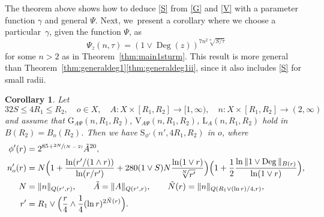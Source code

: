 \documentclass[10pt]{amsart}
\newcommand{\spfrac}[2]{\sfrac{#1}{(#2)}}
\newcommand{\rG}{\mathrm{G}}
\newcommand{\rS}{\mathrm{S}}
\newcommand{\rV}{\mathrm{V}}
\newcommand{\rL}{\mathrm{L}}
\theoremstyle{plain}
\newtheorem{corollary}[theorem]{Corollary}
\theoremstyle{definition}
\DeclareMathOperator{\Deg}{Deg}
\begin{document}
The theorem above shows how to deduce \eqref{S} from \eqref{G} and \eqref{V} with a parameter function $\gamma$ and general $\Psi$. Next, we~present a corollary where we choose a particular~$\gamma$, given the function $\Psi$, as
\[
\Psi_z(n,\tau)=\left(1\vee \Deg(z)
\right)^{7n^2\sqrt[n]{S/\tau}}
\]
for some $n>2$ as in Theorem~\ref{thm:main1sturm}. This result is more general than Theorem~\ref{thm:generaldeg1}\eqref{thm:generaldeg1ii}, since it also includes \eqref{S} for small radii.
\begin{corollary}\label{cor:sobolevall}
Let
\[
32S\leq {4} R_1\leq R_2,\quad o\in X,\quad A\colon X\times [R_1,R_2]\to[1,\infty),\quad {n}\colon X\times [R_1,R_2]\to(2,\infty)
\]
and assume that $\rG_{A\Psi}(n,R_1,R_2)$, $\rV_{\!A\Psi} (n,R_1,R_2)$, $\rL_A(n,R_1,R_2)$ hold in $B(R_2)=B_{o}(R_{2})$.
Then we have $\rS_{\phi'}(n',{4} R_1,R_2)$ in $o$, where
\begin{align*}
\phi'(r)&= 2^{85+\spfrac{2 N}{N-2}}\tilde A^{20},
\\
n_o'(r)&=
N \Bigl(1+\frac{\ln(r'/(1\wedge r))}{\ln(r/r')} +{28
0 (1\vee S) N{\frac{\ln (1\vee r)}{\sqrt[ N]{r'}}}}\Bigr)\Bigl(1+ \frac{1}{2}\frac{\ln\Vert 1\vee \Deg\Vert_{B(r)}} {\ln(1\vee r)}\Bigl),
\\
N&= \Vert n\Vert_{Q(r',r)},\qquad \tilde A= \Vert A\Vert_{Q(r',r)},\qquad \tilde N(r)=\|n\|_{Q(R_1\vee (\ln r)/4,r)},
\\
r'&= R_1\vee\Bigl( \frac{r}{4}\wedge \frac{1}{4}(\ln r)^{2\tilde N(r)}\Bigr).
\end{align*}
\end{corollary}
\end{document}
